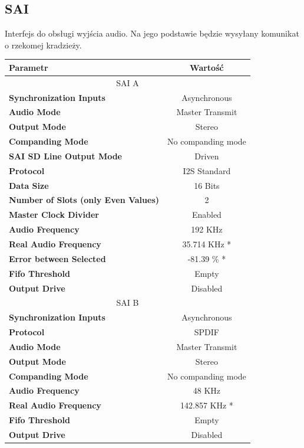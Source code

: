 \documentclass[10pt, a4paper]{article}
\begin{document}
\subsection{SAI}
Interfejs do obsługi wyjścia audio. Na jego podstawie będzie wysyłany komunikat o rzekomej kradzieży.
\begin{table}[H]
\centering
\begin{tabular}{|l|c|}
\hline
\textbf{Parametr} & Wartość \\
\hline
\hline
\multicolumn{2}{|c|}{SAI A} \\ \hline
\textbf{Synchronization Inputs} & Asynchronous \\ \hline
\textbf{Audio Mode} & Master Transmit \\ \hline
\textbf{Output Mode} & Stereo \\ \hline
\textbf{Companding Mode} & No companding mode \\ \hline
\textbf{SAI SD Line Output Mode} & Driven \\ \hline
\textbf{Protocol} & I2S Standard \\ \hline
\textbf{Data Size} & 16 Bits \\ \hline
\textbf{Number of Slots (only Even Values)} & 2 \\ \hline
\textbf{Master Clock Divider} & Enabled \\ \hline
\textbf{Audio Frequency} & 192 KHz \\ \hline
\textbf{Real Audio Frequency} & 35.714 KHz * \\ \hline
\textbf{Error between Selected} & -81.39 \% * \\ \hline
\textbf{Fifo Threshold} & Empty \\ \hline
\textbf{Output Drive} & Disabled \\ \hline
\multicolumn{2}{|c|}{SAI B} \\ \hline
\textbf{Synchronization Inputs} & Asynchronous \\ \hline
\textbf{Protocol} & SPDIF \\ \hline
\textbf{Audio Mode} & Master Transmit \\ \hline
\textbf{Output Mode} & Stereo \\ \hline
\textbf{Companding Mode} & No companding mode \\ \hline
\textbf{Audio Frequency} & 48 KHz \\ \hline
\textbf{Real Audio Frequency} & 142.857 KHz * \\ \hline
\textbf{Fifo Threshold} & Empty \\ \hline
\textbf{Output Drive} & Disabled \\ \hline
\end{tabular}
\end{table}
\newpage
\end{document}

